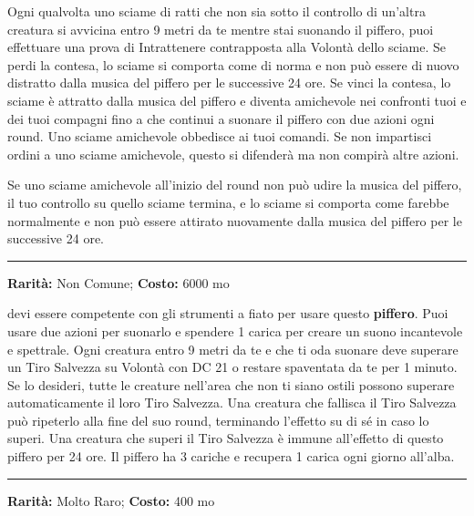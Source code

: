 \begin{multicols}{2}
Ogni qualvolta uno sciame di ratti che non sia sotto il controllo di un'altra creatura si avvicina entro 9 metri da te mentre stai suonando il piffero, puoi effettuare una prova di Intrattenere contrapposta alla Volontà dello sciame. Se perdi la contesa, lo sciame si comporta come di norma e non può essere di nuovo distratto dalla musica del piffero per le successive 24 ore. Se vinci la contesa, lo sciame è attratto dalla musica del piffero e diventa amichevole nei confronti tuoi e dei tuoi compagni fino a che continui a suonare il piffero con due azioni ogni round. Uno sciame amichevole obbedisce ai tuoi comandi. Se non impartisci ordini a uno sciame amichevole, questo si difenderà ma non compirà altre azioni.

Se uno sciame amichevole all'inizio del round non può udire la musica del piffero, il tuo controllo su quello sciame termina, e lo sciame si comporta come farebbe normalmente e non può essere attirato nuovamente dalla musica del piffero per le successive 24 ore.

\smallskip\noindent\rule{\linewidth}{2pt}  \hypertarget{PifferodelloSpavento}{}\medskip{}\noindent\label{PifferodelloSpavento}

\textbf{Rarità:} Non Comune; \textbf{Costo:} 6000 mo

devi essere competente con gli strumenti a fiato per usare questo \textbf{piffero}. Puoi usare due azioni per suonarlo e spendere 1 carica per creare un suono incantevole e spettrale. Ogni creatura entro 9 metri da te e che ti oda suonare deve superare un Tiro Salvezza su Volontà con DC 21 o restare spaventata da te per 1 minuto. Se lo desideri, tutte le creature nell'area che non ti siano ostili possono superare automaticamente il loro Tiro Salvezza. Una creatura che fallisca il Tiro Salvezza può ripeterlo alla fine del suo round, terminando l'effetto su di sé in caso lo superi. Una creatura che superi il Tiro Salvezza è immune all'effetto di questo piffero per 24 ore. Il piffero ha 3 cariche e recupera 1 carica ogni giorno all'alba.

\smallskip\noindent\rule{\linewidth}{2pt}  \hypertarget{PigmentidelleMeraviglie}{}\medskip{}\noindent\label{PigmentidelleMeraviglie}

\textbf{Rarità:} Molto Raro; \textbf{Costo:} 400 mo


\end{multicols}
